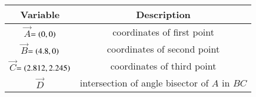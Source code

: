 \begin{tabular}[12pt]{ |c| c|}
    \hline
	\textbf{Variable}  & \textbf{Description} \\
    \hline
	$\vec{A}$$=\left(0,0\right)$ &  coordinates of first point\\
    \hline 
	$\vec{B}$$=\left(4.8,0\right)$ & coordinates of second point\\
    \hline
	$\vec{C}$$=\left(2.812,2.245\right)$ & coordinates of third point\\
    \hline 	
	$\vec{D}$ & intersection of angle bisector of $A$ in $BC$\\
    \hline
\end{tabular}
